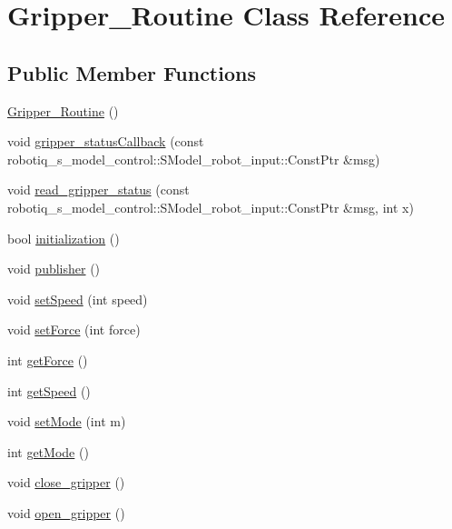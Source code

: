 \hypertarget{class_gripper___routine}{}\section{Gripper\+\_\+\+Routine Class Reference}
\label{class_gripper___routine}
\subsection*{Public Member Functions}
\begin{DoxyCompactItemize}
\item 
\hyperlink{class_gripper___routine_a51242e097a32c6572a98e1b2816bea67}{Gripper\+\_\+\+Routine} ()
\item 
void \hyperlink{class_gripper___routine_a4a754904dafcedb0de8c5f968879a40b}{gripper\+\_\+status\+Callback} (const robotiq\+\_\+s\+\_\+model\+\_\+control\+::\+S\+Model\+\_\+robot\+\_\+input\+::\+Const\+Ptr \&msg)
\item 
void \hyperlink{class_gripper___routine_af7a1a280ec9f567ec327414bf0cca718}{read\+\_\+gripper\+\_\+status} (const robotiq\+\_\+s\+\_\+model\+\_\+control\+::\+S\+Model\+\_\+robot\+\_\+input\+::\+Const\+Ptr \&msg, int x)
\item 
bool \hyperlink{class_gripper___routine_acd8dc4069fd4efecf751b03959b270d4}{initialization} ()
\item 
void \hyperlink{class_gripper___routine_a60a97d0665807ddacd817fc3d908accd}{publisher} ()
\item 
void \hyperlink{class_gripper___routine_a2b087442820654560d8976d58cd330a3}{set\+Speed} (int speed)
\item 
void \hyperlink{class_gripper___routine_a1b00827a69d840e2953b807eb074674c}{set\+Force} (int force)
\item 
int \hyperlink{class_gripper___routine_a24413b52d713bdbd0c74f1bf69e2a318}{get\+Force} ()
\item 
int \hyperlink{class_gripper___routine_a98cc0ac9c2405e5d63bf30d94b8a86b4}{get\+Speed} ()
\item 
void \hyperlink{class_gripper___routine_a0235d458d0232b5bb9efb1bda7b9d3fd}{set\+Mode} (int m)
\item 
int \hyperlink{class_gripper___routine_a8c26f63531e92730aa655102145eb4cb}{get\+Mode} ()
\item 
void \hyperlink{class_gripper___routine_ac288893cdf08ffd888706252470d6e4c}{close\+\_\+gripper} ()
\item 
void \hyperlink{class_gripper___routine_a99978b531de2ea31bc19b49ec832a398}{open\+\_\+gripper} ()
\end{DoxyCompactItemize}
